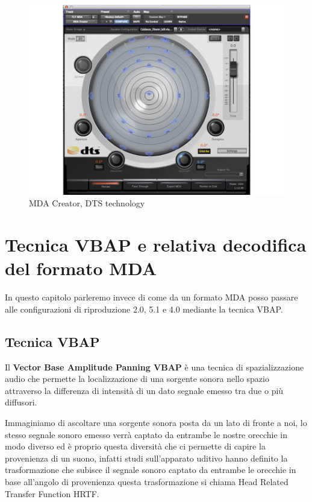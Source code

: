 \documentclass[12pt,a4paper]{report}
\begin{document}
\begin{figure}[htbp]
	\centering
	\includegraphics[scale=0.50]{figures/mdacreator.jpg}
	\caption {MDA Creator, DTS technology}
	\label{fig:mdacreator}
	\end{figure}

\chapter{Tecnica VBAP e relativa decodifica del formato MDA}

In questo capitolo parleremo invece di come da un formato MDA posso passare alle configurazioni di riproduzione 2.0, 5.1 e 4.0 mediante la tecnica VBAP.


\section{Tecnica VBAP}

Il \textbf{Vector Base Amplitude Panning VBAP} è una tecnica di spazializzazione audio che permette la localizzazione di  una sorgente sonora nello spazio attraverso la differenza di intensità di un dato segnale emesso tra due o più diffusori.

Immaginiamo di ascoltare una sorgente sonora posta da un lato di fronte a noi, lo stesso segnale sonoro emesso verrà captato da entrambe le nostre orecchie in modo diverso ed è proprio questa diversità che ci permette di capire la provenienza di un suono, infatti studi sull'apparato uditivo hanno definito la trasformazione che subisce il segnale sonoro captato da entrambe le orecchie in base all'angolo di provenienza questa trasformazione si chiama Head Related Transfer Function HRTF.
\end{document}
